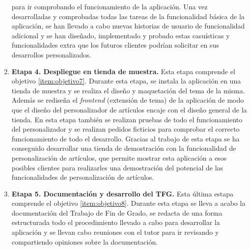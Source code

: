 \documentclass[11pt]{article}
\begin{document}
\begin{enumerate}[label={\textbf{\textbullet}}]
    para ir comprobando el funcionamiento de la aplicación. Una vez desarrolladas y comprobadas todas las tareas de la funcionalidad básica de la aplicación, se han llevado a cabo nuevas historias de usuario de funcionalidad adicional y se han diseñado, implementado y probado estas casuísticas y funcionalidades
    extra que los futuros clientes podrían solicitar en sus desarrollos personalizados.
    \item \textbf{Etapa 4. Despliegue en tienda de muestra.} Esta etapa comprende el objetivo \ref{item:objetivo7}. 
    Durante esta etapa, se instala la aplicación en una tienda de muestra y se realiza el diseño y maquetación del tema de la misma. Además se rediseña el \textit{frontend} (extensión de tema) de la aplicación de modo que el diseño del personalizador de artículos
    encaje con el diseño general de la tienda. En esta etapa también se realizan pruebas de todo el funcionamiento del personalizador y se realizan pedidos ficticios para comprobar el correcto
    funcionamiento de todo el desarrollo. Gracias al trabajo de esta etapa se ha conseguido desarrollar una tienda de demostración con la funcionalidad de personalización de artículos, que permite
    mostrar esta aplicación a esos posibles clientes para realizarles una demostración del potencial de las funcionalidades de personalización de artículos.
    \item \textbf{Etapa 5. Documentación y desarrollo del TFG.} Esta última estapa comprende el objetivo \ref{item:objetivo8}. Durante esta etapa
    se lleva a acabo la documentación del Trabajo de Fin de Grado, se redacta de una forma estructurada todo el procedimiento llevado a cabo para desarrollar
    la aplicación y se llevan cabo reuniones con el tutor para ir revisando y compartiendo opiniones sobre la documentación.
\end{enumerate}

\clearpage
\end{document}
